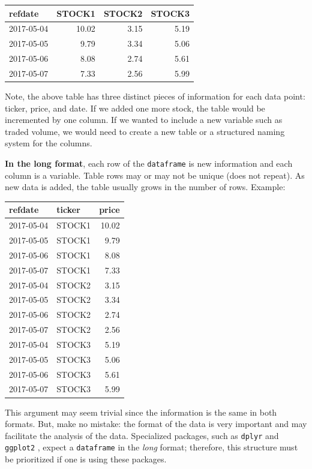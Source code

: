 \documentclass[11pt,]{book}
\begin{document}
\begin{tabular}{l|r|r|r}
\hline
refdate & STOCK1 & STOCK2 & STOCK3\\
\hline
2017-05-04 & 10.02 & 3.15 & 5.19\\
\hline
2017-05-05 & 9.79 & 3.34 & 5.06\\
\hline
2017-05-06 & 8.08 & 2.74 & 5.61\\
\hline
2017-05-07 & 7.33 & 2.56 & 5.99\\
\hline
\end{tabular}

Note, the above table has three distinct pieces of information for each
data point: ticker, price, and date. If we added one more stock, the
table would be incremented by one column. If we wanted to include a new
variable such as traded volume, we would need to create a new table or a
structured naming system for the columns.

\textbf{In the long format}, each row of the \texttt{dataframe} is new
information and each column is a variable. Table rows may or may not be
unique (does not repeat). As new data is added, the table usually grows
in the number of rows. Example:

\begin{tabular}{l|l|r}
\hline
refdate & ticker & price\\
\hline
2017-05-04 & STOCK1 & 10.02\\
\hline
2017-05-05 & STOCK1 & 9.79\\
\hline
2017-05-06 & STOCK1 & 8.08\\
\hline
2017-05-07 & STOCK1 & 7.33\\
\hline
2017-05-04 & STOCK2 & 3.15\\
\hline
2017-05-05 & STOCK2 & 3.34\\
\hline
2017-05-06 & STOCK2 & 2.74\\
\hline
2017-05-07 & STOCK2 & 2.56\\
\hline
2017-05-04 & STOCK3 & 5.19\\
\hline
2017-05-05 & STOCK3 & 5.06\\
\hline
2017-05-06 & STOCK3 & 5.61\\
\hline
2017-05-07 & STOCK3 & 5.99\\
\hline
\end{tabular}

This argument may seem trivial since the information is the same in both
formats. But, make no mistake: the format of the data is very important
and may facilitate the analysis of the data. Specialized packages, such
as \texttt{dplyr} \citep{dplyr} and \texttt{ggplot2}
\citep{wickham2009ggplot2}, expect a \texttt{dataframe} in the
\emph{long} format; therefore, this structure must be prioritized if one
is using these packages.
\end{document}
